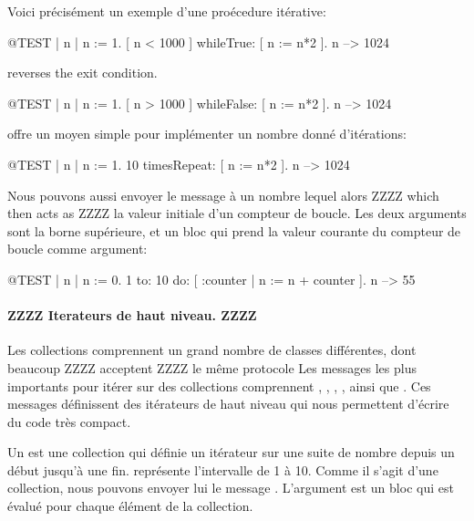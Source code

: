 \documentclass[a4paper,10pt,twoside]{book}
\begin{document}
Voici pr\'{e}cis\'{e}ment un exemple d'une pro\'{e}cedure it\'{e}rative:

\begin{code}{@TEST | n |}
n := 1.
[ n < 1000 ] whileTrue: [ n := n*2 ].
n --> 1024
\end{code}

\noindent
{} reverses the exit condition.
\begin{code}{@TEST | n |}
n := 1.
[ n > 1000 ] whileFalse: [ n := n*2 ].
n --> 1024
\end{code}

\noindent
{} offre un moyen simple pour impl\'{e}menter un nombre donn\'{e} d'it\'{e}rations:
\begin{code}{@TEST | n |}
n := 1.
10 timesRepeat: [ n := n*2 ].
n --> 1024
\end{code}

Nous pouvons aussi envoyer le message  \`{a} un nombre lequel alors ZZZZ which then acts as ZZZZ la valeur initiale d'un compteur de boucle. 
Les deux arguments sont la borne sup\'{e}rieure, et un bloc qui prend la valeur courante du compteur de boucle comme argument:

\begin{code}{@TEST | n |}
n := 0.
1 to: 10 do: [ :counter | n := n + counter ].
n --> 55
\end{code}

\paragraph{ZZZZ  Iterateurs de haut niveau. ZZZZ}

Les collections comprennent un grand nombre de classes diff\'{e}rentes, dont beaucoup
ZZZZ acceptent ZZZZ le m\^{e}me protocole  
Les messages les plus importants pour it\'{e}rer sur des collections comprennent 
, , , ,  ainsi que  .
Ces messages d\'{e}finissent des it\'{e}rateurs de haut niveau qui nous permettent d'\'{e}crire du code tr\`{e}s compact.


Un  est une collection qui d\'{e}finie un it\'{e}rateur sur une suite de nombre depuis un d\'{e}but jusqu'\`{a} une fin.
 repr\'{e}sente l'intervalle de 1 \`{a} 10.
Comme il s'agit d'une collection, nous pouvons envoyer lui le message .
L'argument est un bloc qui est \'{e}valu\'{e} pour chaque \'{e}l\'{e}ment de la collection.
\end{document}
